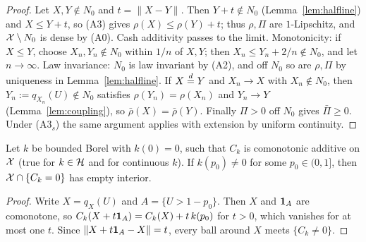 \begin{proof}
Let $X,Y\notin N_0$ and $t=\|X-Y\|$. Then $Y+t\notin N_0$ (Lemma~\ref{lem:halfline}) and $X\le Y+t$, so (A3) gives
$\rho(X)\le\rho(Y)+t$; thus $\rho,\Pi$ are $1$-Lipschitz, and $\mathcal X\setminus N_0$ is dense by (A0). Cash additivity
passes to the limit. Monotonicity: if $X\le Y$, choose $X_n,Y_n\notin N_0$ within $1/n$ of $X,Y$; then
$X_n\le Y_n+2/n\notin N_0$, and let $n\to\infty$. Law invariance: $N_0$ is law invariant by (A2), and off $N_0$ so are
$\rho,\Pi$ by uniqueness in Lemma~\ref{lem:halfline}. If $X\overset{d}{=} Y$ and $X_n\to X$ with $X_n\notin N_0$, then
$Y_n:=q_{X_n}(U)\notin N_0$ satisfies $\rho(Y_n)=\rho(X_n)$ and $Y_n\to Y$ (Lemma~\ref{lem:coupling}), so
$\bar\rho(X)=\bar\rho(Y)$. Finally $\Pi>0$ off $N_0$ gives $\bar\Pi\ge0$. Under (A3$_s$) the same argument applies with
extension by uniform continuity. \qedhere
\end{proof}

\begin{lemma}[Sweep]\label{lem:sweep}
Let $k$ be bounded Borel with $k(0)=0$, such that $C_k$ is comonotonic additive on $\mathcal X$ (true for $k\in\mathcal H$ and
for continuous $k$). If $k(p_0)\ne0$ for some $p_0\in(0,1]$, then $\mathcal X\cap\{C_k=0\}$ has empty interior.
\end{lemma}

\begin{proof}
Write $X=q_X(U)$ and $A=\{U>1-p_0\}$. Then $X$ and $\mathbf 1_A$ are comonotone, so $C_k(X+t\mathbf 1_A)=C_k(X)+t\,k(p_0)$ for
$t>0$, which vanishes for at most one $t$. Since $\|X+t\mathbf 1_A-X\|=t$, every ball around $X$ meets $\{C_k\ne0\}$. \qedhere
\end{proof}

